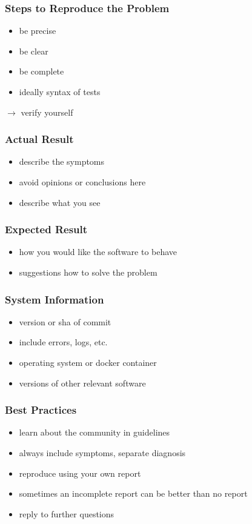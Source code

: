 \begin{frame}
	\frametitle{Steps to Reproduce the Problem}
	\begin{itemize}
		\item be precise
		\item be clear
		\item be complete
		\item ideally syntax of tests
	\end{itemize}
	\vspace{1cm}
	$\rightarrow$ verify yourself
\end{frame}

\begin{frame}
	\frametitle{Actual Result}
	\begin{itemize}
		\item describe the symptoms
		\item avoid opinions or conclusions here
		\item describe what you see
	\end{itemize}
\end{frame}

\begin{frame}
	\frametitle{Expected Result}
	\begin{itemize}
		\item how you would like the software to behave
		\item suggestions how to solve the problem
	\end{itemize}
\end{frame}

\begin{frame}
	\frametitle{System Information}
	\begin{itemize}
		\item version or sha of commit
		\item include errors, logs, etc.
		\item operating system or docker container
		\item versions of other relevant software
	\end{itemize}
\end{frame}

\begin{frame}
	\frametitle{Best Practices}
	\begin{itemize}
		\item learn about the community in guidelines
		\item always include symptoms, separate diagnosis
		\item reproduce using your own report
		\item sometimes an incomplete report can be better than no report
		\item reply to further questions
	\end{itemize}
\end{frame}


